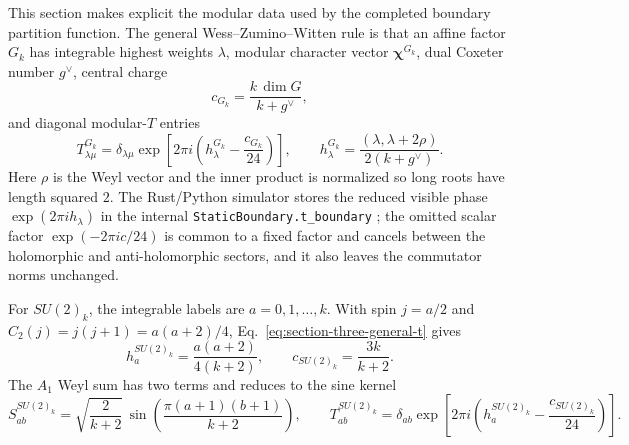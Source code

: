 \documentclass[11pt]{article}
\DeclareRobustCommand{\pyvar}[1]{%
  \ifmmode\text{\nolinkurl{#1}}\else\nolinkurl{#1}\fi%
}
\begin{document}
This section makes explicit the modular data used by the completed boundary
partition function.  The general Wess--Zumino--Witten rule is that an affine
factor $G_k$ has integrable highest weights $\lambda$, modular character vector
$\boldsymbol\chi^{G_k}$, dual Coxeter number $g^{\vee}$, central charge
\begin{equation}
\label{eq:section-three-general-central-charge}
 c_{G_k}=\frac{k\,\dim G}{k+g^{\vee}},
\end{equation}
and diagonal modular-$T$ entries
\begin{equation}
\label{eq:section-three-general-t}
 T^{G_k}_{\lambda\mu}
 =
 \delta_{\lambda\mu}
 \exp\!\left[2\pi i\left(h_{\lambda}^{G_k}-\frac{c_{G_k}}{24}\right)\right],
 \qquad
 h_{\lambda}^{G_k}
 =
 \frac{(\lambda,\lambda+2\rho)}{2(k+g^{\vee})}.
\end{equation}
Here $\rho$ is the Weyl vector and the inner product is normalized so long
roots have length squared $2$.  The Rust/Python simulator stores the reduced visible
phase $\exp(2\pi i h_{\lambda})$ in the internal
\pyvar{StaticBoundary.t_boundary}; the omitted scalar
factor $\exp(-2\pi i c/24)$ is common to a fixed factor and cancels between the
holomorphic and anti-holomorphic sectors, and it also leaves the commutator
norms unchanged.

For $SU(2)_k$, the integrable labels are $a=0,1,\ldots,k$.  With spin
$j=a/2$ and $C_2(j)=j(j+1)=a(a+2)/4$, Eq.~\eqref{eq:section-three-general-t}
gives
\begin{equation}
\label{eq:section-three-su2-weight}
 h^{SU(2)_k}_{a}
 =
 \frac{a(a+2)}{4(k+2)},
 \qquad
 c_{SU(2)_k}=\frac{3k}{k+2}.
\end{equation}
The $A_1$ Weyl sum has two terms and reduces to the sine kernel
\begin{equation}
\label{eq:section-three-su2-s}
 S^{SU(2)_k}_{ab}
 =
 \sqrt{\frac{2}{k+2}}\,
 \sin\!\left(\frac{\pi(a+1)(b+1)}{k+2}\right),
 \qquad
 T^{SU(2)_k}_{ab}
 =
 \delta_{ab}\exp\!\left[2\pi i\left(h^{SU(2)_k}_{a}
 -\frac{c_{SU(2)_k}}{24}\right)\right].
\end{equation}
\end{document}
